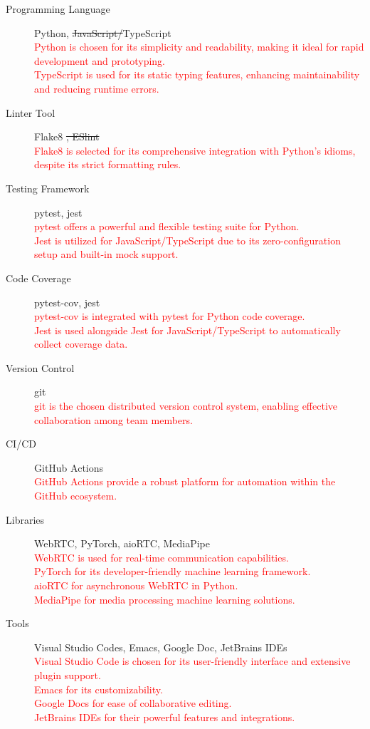 \documentclass{article}
\begin{document}
\begin{description}

\item[Programming Language] Python, \sout{JavaScript/}TypeScript\\
\textcolor{red}{Python is chosen for its simplicity and readability, making it ideal for rapid development and prototyping.\\ 
 TypeScript is used for its static typing features, enhancing maintainability and reducing runtime errors.}
\item[Linter Tool] Flake8 \sout{, ESlint}\\
\textcolor{red}{Flake8 is selected for its comprehensive integration with Python's idioms, despite its strict formatting rules.}
\item[Testing Framework] pytest, jest\\
\textcolor{red}{pytest offers a powerful and flexible testing suite for Python.\\
 Jest is utilized for JavaScript/TypeScript due to its zero-configuration setup and built-in mock support.}
\item[Code Coverage] pytest-cov, jest\\
\textcolor{red}{pytest-cov is integrated with pytest for Python code coverage.\\
 Jest is used alongside Jest for JavaScript/TypeScript to automatically collect coverage data.}
\item[Version Control] git\\
\textcolor{red}{git is the chosen distributed version control system, enabling effective collaboration among team members.}
\item[CI/CD] GitHub Actions\\
\textcolor{red}{GitHub Actions provide a robust platform for automation within the GitHub ecosystem.}
\item[Libraries] WebRTC, PyTorch, aioRTC, MediaPipe\\
\textcolor{red}{WebRTC is used for real-time communication capabilities.\\
 PyTorch for its developer-friendly machine learning framework.\\
 aioRTC for asynchronous WebRTC in Python.\\
 MediaPipe for media processing machine learning solutions.}
\item[Tools] Visual Studio Codes, Emacs, Google Doc, JetBrains IDEs\\
\textcolor{red}{Visual Studio Code is chosen for its user-friendly interface and extensive plugin support.\\
 Emacs for its customizability.\\
  Google Docs for ease of collaborative editing.\\
  JetBrains IDEs for their powerful features and integrations.}
\end{description}
\end{document}

